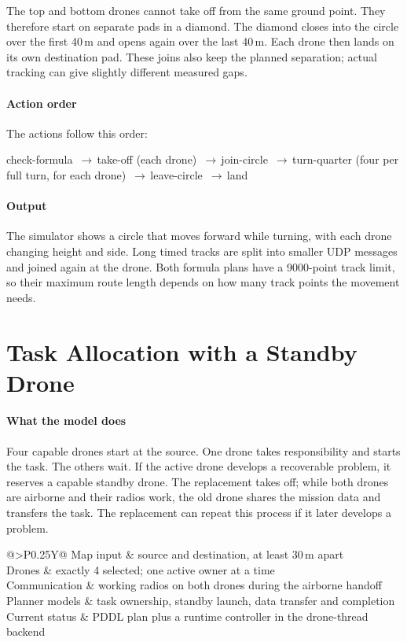 \documentclass[11pt,a4paper,oneside]{report}
\makeatletter
\newcommand{\glancebox}[2]{%
  \begin{tcolorbox}[enhanced,colback=softblue!45,colframe=navy,coltitle=white,
      fonttitle=\bfseries\small,title={#1},boxrule=0.6pt,arc=2pt,
      left=6pt,right=6pt,top=3pt,bottom=3pt,before skip=8pt,after skip=10pt]
    \small\setstretch{1.1}%
    \begin{tabularx}{\linewidth}{@{}>{\bfseries}P{0.25\linewidth}Y@{}}#2\end{tabularx}
  \end{tcolorbox}}
\newcommand{\then}{\,{\color{amber!80!black}$\boldsymbol{\rightarrow}$}\allowbreak\,}
\newcommand{\actionflow}[1]{%
  \par\begin{tcolorbox}[colback=codebg,colframe=coderule,boxrule=0.4pt,arc=2pt,
      left=5pt,right=5pt,top=2pt,bottom=2pt,before skip=6pt,after skip=8pt]
    \footnotesize\ttfamily\raggedright\setstretch{1.25}#1
  \end{tcolorbox}}
\makeatother
\begin{document}
The top and bottom drones cannot take off from the same ground point. They therefore start on
separate pads in a diamond. The diamond closes into the circle over the first 40\,m and opens
again over the last 40\,m. Each drone then lands on its own destination pad. These joins also
keep the planned separation; actual tracking can give slightly different measured gaps.

\paragraph{Action order} The actions follow this order:
\actionflow{check-formula \then take-off (each drone) \then join-circle \then turn-quarter
(four per full turn, for each drone) \then leave-circle \then land}

\paragraph{Output}
The simulator shows a circle that moves forward while turning, with each drone changing height
and side. Long timed tracks are split into smaller UDP messages and joined again at the drone.
Both formula plans have a 9000-point track limit, so their maximum route length depends on how
many track points the movement needs.

\section{Task Allocation with a Standby Drone}\label{sec:plan-task}
\paragraph{What the model does}
Four capable drones start at the source. One drone takes responsibility and starts the task.
The others wait. If the active drone develops a recoverable problem, it reserves a capable
standby drone. The replacement takes off; while both drones are airborne and their radios work,
the old drone shares the mission data and transfers the task. The replacement can repeat this
process if it later develops a problem.

\glancebox{At a glance: task allocation model}{
Map input & source and destination, at least 30\,m apart \\
Drones & exactly 4 selected; one active owner at a time \\
Communication & working radios on both drones during the airborne handoff \\
Planner models & task ownership, standby launch, data transfer and completion \\
Current status & PDDL plan plus a runtime controller in the drone-thread backend \\}
\end{document}
